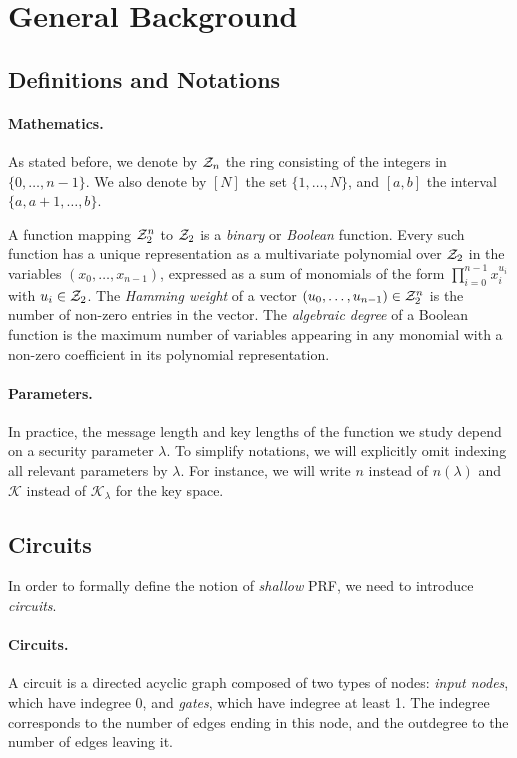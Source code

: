 
\section{General Background}
\label{sec:notations}

\subsection{Definitions and Notations}

 \paragraph{Mathematics.} As stated before, we denote by $\mathcal{Z}_n$ the ring consisting of the integers in $\{0, \dots, n-1\}$. We also denote by $[N]$ the set $\{1, \dots, N\}$, and $[a,b]$ the interval $\{a, a+1, \dots, b\}$.

A function mapping $\mathcal{Z}_2^n$ to $\mathcal{Z}_2$ is a \emph{binary} or \emph{Boolean} function. Every such function has a unique representation as a multivariate polynomial over $\mathcal{Z}_2$ in the variables $(x_0, \dots, x_{n-1})$, expressed as a sum of monomials of the form $\prod_{i=0}^{n-1} x_i^{u_i}$ with $u_i \in \mathcal{Z}_2$. The \emph{Hamming weight} of a vector $(u_0, \dots, u_{n-1}) \in \mathcal{Z}_2^n$ is the number of non-zero entries in the vector. The \emph{algebraic degree} of a Boolean function is the maximum number of variables appearing in any monomial with a non-zero coefficient in its polynomial representation.

\paragraph{Parameters.}
In practice, the message length and key lengths of the function we study depend on a security parameter $\lambda$. To simplify notations, we will  explicitly omit indexing all relevant parameters by $\lambda$. For instance, we will write $n$ instead of $n(\lambda)$ and $\mathcal{K}$ instead of $\mathcal{K}_{\lambda}$ for the key space.


\subsection{Circuits}

In order to formally define the notion of \emph{shallow} PRF, we need to introduce \emph{circuits}.

\paragraph{Circuits.} A circuit is a directed acyclic graph composed of two types of nodes: \emph{input nodes}, which have indegree 0, and \emph{gates}, which have indegree at least 1. The indegree corresponds to the number of edges ending in this node, and the outdegree to the number of edges leaving it.

